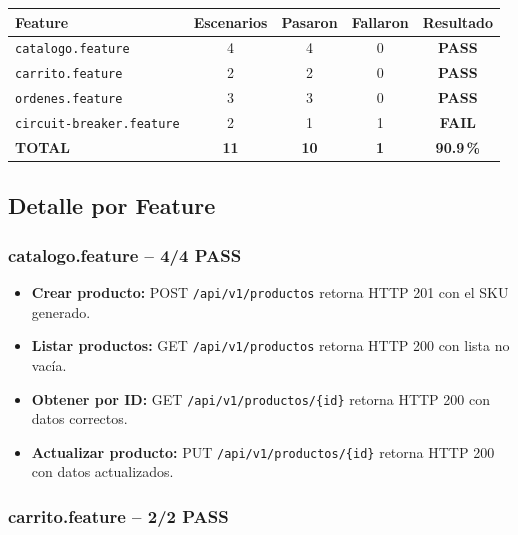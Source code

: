 \documentclass[12pt,a4paper]{article}
\newcommand{\pass}{\textcolor{passgreen}{\bfseries PASS}}
\newcommand{\fail}{\textcolor{failred}{\bfseries FAIL}}
\begin{document}
\vspace{0.5cm}
\begin{center}
\begin{tabular}{@{}lcccc@{}}
  \toprule
  \rowcolor{headbg}
  \textcolor{headfg}{\textbf{Feature}} &
  \textcolor{headfg}{\textbf{Escenarios}} &
  \textcolor{headfg}{\textbf{Pasaron}} &
  \textcolor{headfg}{\textbf{Fallaron}} &
  \textcolor{headfg}{\textbf{Resultado}} \\
  \midrule
  \texttt{catalogo.feature}        & 4 & 4 & 0 & \pass \\
  \texttt{carrito.feature}         & 2 & 2 & 0 & \pass \\
  \texttt{ordenes.feature}         & 3 & 3 & 0 & \pass \\
  \texttt{circuit-breaker.feature} & 2 & 1 & 1 & \fail \\
  \midrule
  \textbf{TOTAL}                   & \textbf{11} & \textbf{10} & \textbf{1} & \textbf{90.9\,\%} \\
  \bottomrule
\end{tabular}
\end{center}

\subsection{Detalle por Feature}

\subsubsection{catalogo.feature -- 4/4 PASS}

\begin{itemize}[leftmargin=2cm]
  \item[\pass] \textbf{Crear producto:} POST \texttt{/api/v1/productos} retorna HTTP 201 con el SKU generado.
  \item[\pass] \textbf{Listar productos:} GET \texttt{/api/v1/productos} retorna HTTP 200 con lista no vac\'ia.
  \item[\pass] \textbf{Obtener por ID:} GET \texttt{/api/v1/productos/\{id\}} retorna HTTP 200 con datos correctos.
  \item[\pass] \textbf{Actualizar producto:} PUT \texttt{/api/v1/productos/\{id\}} retorna HTTP 200 con datos actualizados.
\end{itemize}

\subsubsection{carrito.feature -- 2/2 PASS}
\end{document}
